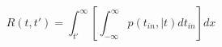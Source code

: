 \begin{equation}
R(t,t') = \int_{t'}^\infty \left[ \int_{-\infty}^\infty p(t_{in},|t) dt_{in} \right]  dx
\end{equation}